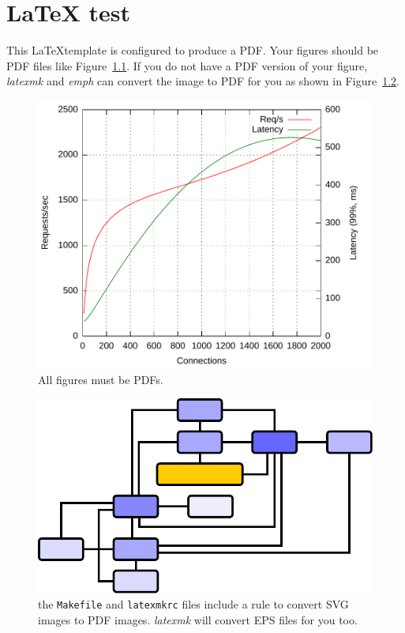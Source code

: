 \chapter{{\LaTeX} test}

This \LaTeX template is configured to produce a PDF.
Your figures should be PDF files like Figure~\ref{fig:pdf}.
If you do not have a PDF version of your figure, \emph{latexmk} and \emph{emph} can convert the image to PDF for you as shown in Figure~\ref{fig:svg}.

\begin{figure}
  \centering
  \includegraphics{figures/just-a-plot}
  \caption[Figures must be PDF]{All figures must be PDFs.}
  \label{fig:pdf}
\end{figure}

\begin{figure}
  \centering
  \includegraphics{figures/just-a-graph}
  \caption[SVG converted to PDF]{the \texttt{Makefile} and \texttt{latexmkrc} files include a rule to convert SVG images to PDF images.
	\emph{latexmk} will convert EPS files for you too.}
  \label{fig:svg}
\end{figure}

